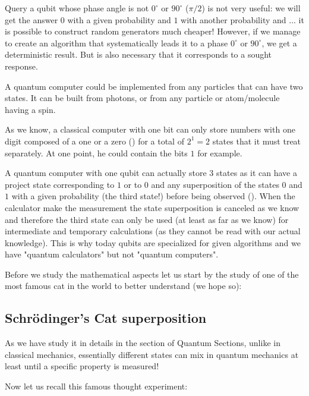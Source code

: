 	Query a qubit whose phase angle is not $0^{\circ}$ or $90^{\circ}$ ($\pi/2$) is not very useful: we will get the answer $0$ with a given probability and $1$ with another probability and ... it is possible to construct random generators much cheaper! However, if we manage to create an algorithm that systematically leads it to a phase $0^{\circ}$ or $90^{\circ}$, we get a deterministic result. But is also necessary that it corresponds to a sought response.
	
	A quantum computer could be implemented from any particles that can have two states. It can be built from photons, or from any particle or atom/molecule having a spin.
	
	As we know, a classical computer with one bit can only store numbers with one digit composed of a one or a zero () for a total of $2^1=2$ states that it must treat separately. At one point, he could contain the bits $1$ for example.
	
	A quantum computer with one qubit can actually store $3$ states as it can have a project state corresponding to $1$ or to $0$ and any superposition of the states $0$ and $1$ with a given probability (the third state!) before being observed (). When the calculator make the measurement the state superposition is canceled as we know and therefore the third state can only be used (at least as far as we know) for intermediate and temporary calculations (as they cannot be read with our actual knowledge). This is why today qubits are specialized for given algorithms and we have "quantum calculators" but not "quantum computers".
	
	Before we study the mathematical aspects let us start by the study of one of the most famous cat in the world to better understand (we hope so):	
	
	\subsection{Schrödinger's Cat superposition}
	As we have study it in details in the section of Quantum Sections, unlike in classical mechanics, essentially different states can mix in
quantum mechanics at least until a specific property is measured!

	Now let us recall this famous thought experiment:
	
